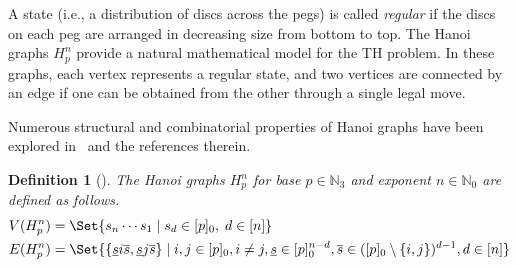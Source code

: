 \documentclass[letterpaper,12pt]{article}
\newtheorem{definition}{Definition}
\begin{document}
A state  (i.e., a distribution of discs across the pegs) is called   \textit{regular}  if the discs on each peg are arranged in decreasing size from bottom to top. The Hanoi graphs $H_p^n$ provide a natural mathematical model for the TH problem. In these graphs, each vertex represents a regular state, and two vertices are connected by an edge if one can be obtained from the other through a single legal move.

Numerous structural and combinatorial properties of Hanoi graphs have been explored in~\cite{hinz2018tower} and the references therein.







\begin{definition}[\cite{hinz2018tower}]\label{def:hanoi_graph_defenition}
The Hanoi graphs $H_p^n$ for base $p \in \mathbb{N}_3$ and exponent $n \in \mathbb{N}_0$ are defined as follows.
    \begin{align*}
        V(H_p^n)&=\Set{s_{n}\cdots s_{1}\mid s_{d}\in[p]_{0},\;  d\in [n]}\\
        E(H_p^n)&=\Set{\{ \underline{s}i\overline{s},\underline{s}j\overline{s}\}\mid i,j\in[p]_{0},i\neq j, \underline{s}\in [p]_{0}^{n-d},\overline{s}\in ([p]_{0}\setminus\{i,j\})^{d-1}, d\in [n]  }
    \end{align*}
\end{definition}
 
\end{document}
